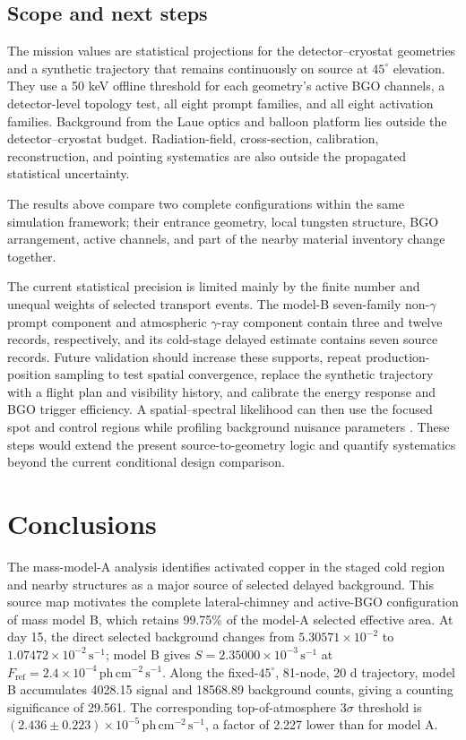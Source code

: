 \documentclass[11pt]{article}
\newcommand{\revblue}[1]{\textcolor{revisionblue}{#1}}
\newcommand{\phcms}{\ensuremath{\,\mathrm{ph\,cm^{-2}\,s^{-1}}}}
\newcommand{\cps}{\ensuremath{\,\mathrm{s^{-1}}}}
\newcommand{\fref}{F_{\mathrm{ref}}}
\begin{document}
\subsection{Scope and next steps}
\label{subsec:limitations}

The mission values are statistical projections for the detector--cryostat
geometries and a synthetic trajectory that remains continuously on source at
$45^\circ$ elevation. They use a 50 keV offline threshold for each geometry's
active BGO channels, a detector-level topology test, all eight prompt families, and all eight
activation families. Background from the Laue optics and balloon platform lies
outside the detector--cryostat budget. Radiation-field, cross-section,
calibration, reconstruction, and pointing systematics are also outside the
propagated statistical uncertainty.

\revblue{The results above compare two complete configurations within the same
simulation framework; their entrance geometry, local tungsten structure, BGO
arrangement, active channels, and part of the nearby material inventory change
together.}

The current statistical precision is limited mainly by the finite number and
unequal weights of selected transport events. The model-B \revblue{seven-family non-$\gamma$ prompt component} and
\revblue{atmospheric $\gamma$-ray component} contain three and twelve records, respectively,
and its cold-stage delayed estimate contains seven source records. Future
validation should increase these supports, repeat production-position sampling
to test spatial convergence, replace the synthetic trajectory with a flight
plan and visibility history, and calibrate the energy response and BGO trigger
efficiency. A spatial--spectral likelihood can then use the focused spot and
control regions while profiling background nuisance parameters
\cite{Cowan2011}. These steps would extend the present source-to-geometry logic
and quantify systematics beyond the current conditional design comparison.

\section{Conclusions}
\label{sec:conclusions}

The mass-model-A analysis identifies activated copper in the staged cold region
and nearby structures as a major source of selected delayed background. This
source map motivates the complete lateral-chimney and active-BGO configuration
of mass model B, which retains 99.75\% of the model-A selected effective area.
At day 15, the direct selected background changes from
$5.30571\times10^{-2}$ to $1.07472\times10^{-2}\cps$; model B gives
$S=2.35000\times10^{-3}\cps$ at $\fref=2.4\times10^{-4}\phcms$. Along the
fixed-$45^\circ$, 81-node, 20 d trajectory, model B accumulates 4028.15 signal
and 18568.89 background counts, giving a counting significance of 29.561. The
corresponding top-of-atmosphere $3\sigma$ threshold is
$(2.436\pm0.223)\times10^{-5}\phcms$, a factor of 2.227 lower than for model A.
\end{document}
